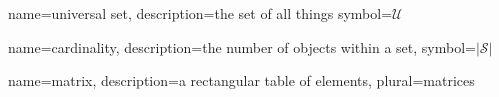 
{name={universal set}, %
 description={the set of all things} %
 symbol={\ensuremath{\mathcal{U}}}  %
}

{name=cardinality, %
 description={the number of objects within a set}, %
 symbol={\ensuremath{|\mathcal{S}|}} %
}

{name=matrix, %
 description={a rectangular table of elements}, %
 plural=matrices %
}

